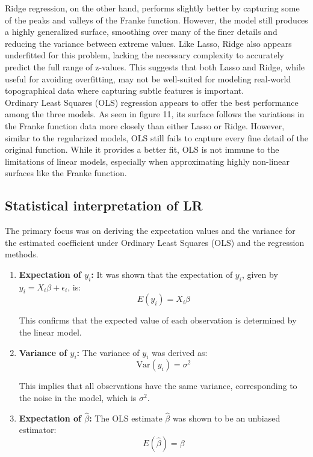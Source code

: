 \documentclass{article}
\begin{document}
\begin{enumerate}
Ridge regression, on the other hand, performs slightly better by capturing some of the peaks and valleys of the Franke function. However, the model still produces a highly generalized surface, smoothing over many of the finer details and reducing the variance between extreme values. Like Lasso, Ridge also appears underfitted for this problem, lacking the necessary complexity to accurately predict the full range of z-values. This suggests that both Lasso and Ridge, while useful for avoiding overfitting, may not be well-suited for modeling real-world topographical data where capturing subtle features is important.\\

Ordinary Least Squares (OLS) regression appears to offer the best performance among the three models. As seen in figure 11, its surface follows the variations in the Franke function data more closely than either Lasso or Ridge. However, similar to the regularized models, OLS still fails to capture every fine detail of the original function. While it provides a better fit, OLS is not immune to the limitations of linear models, especially when approximating highly non-linear surfaces like the Franke function.

\subsection{Statistical interpretation of LR}
The primary focus was on deriving the expectation values and the variance for the estimated coefficient under Ordinary Least Squares (OLS) and the regression methods. 

\begin{enumerate}
    \item \textbf{Expectation of $y_i$:} It was shown that the expectation of $y_i$, given by $ y_i = X_i \beta + \epsilon_i $, is:
    \[
    E(y_i) = X_i \beta
    \]

This confirms that the expected value of each observation is determined by the linear model. 

    \item \textbf{Variance of $y_i$:} The variance of $y_i$ was derived as:
    \[
    \text{Var}(y_i) = \sigma^2
    \]

This implies that all observations have the same variance, corresponding to the noise in the model, which is $\sigma^2$.

    \item \textbf{Expectation of $\hat{\beta}$:} The OLS estimate $\hat{\beta}$ was shown to be an unbiased estimator:
    \[
    E(\hat{\beta}) = \beta
    \]


\end{enumerate}
\end{enumerate}
\end{document}
